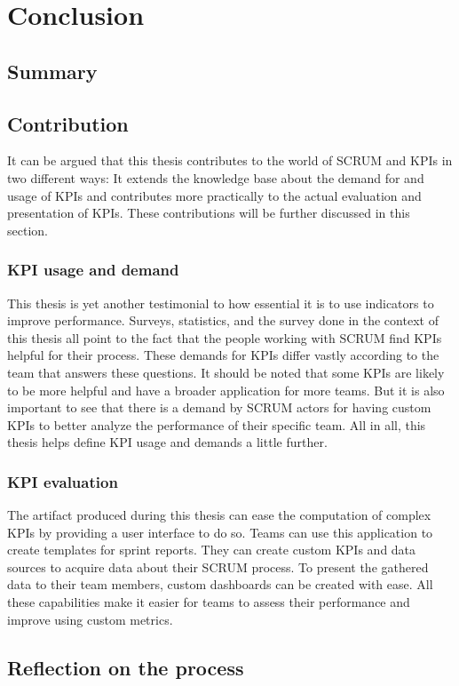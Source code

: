 
\chapter{Conclusion} 

\label{Chapter7} 

\section{Summary}

\section{Contribution}

It can be argued that this thesis contributes to the world of SCRUM and KPIs in two different ways: It extends the knowledge base about the demand for and usage of KPIs and contributes more practically to the actual evaluation and presentation of KPIs. These contributions will be further discussed in this section. 

\subsection{KPI usage and demand}

This thesis is yet another testimonial to how essential it is to use indicators to improve performance. Surveys, statistics, and the survey done in the context of this thesis all point to the fact that the people working with SCRUM find KPIs helpful for their process. These demands for KPIs differ vastly according to the team that answers these questions. It should be noted that some KPIs are likely to be more helpful and have a broader application for more teams. But it is also important to see that there is a demand by SCRUM actors for having custom KPIs to better analyze the performance of their specific team. All in all, this thesis helps define KPI usage and demands a little further.

\subsection{KPI evaluation}

The artifact produced during this thesis can ease the computation of complex KPIs by providing a user interface to do so. Teams can use this application to create templates for sprint reports. They can create custom KPIs and data sources to acquire data about their SCRUM process. To present the gathered data to their team members, custom dashboards can be created with ease. All these capabilities make it easier for teams to assess their performance and improve using custom metrics.


\section{Reflection on the process}